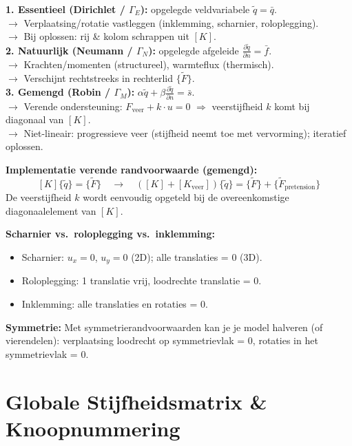 \documentclass[a4paper,10pt]{article}
\begin{document}
\begin{exambox}
\textbf{1. Essentieel (Dirichlet / $\Gamma_E$):} opgelegde veldvariabele $\tilde{q} = \bar{q}$.\\
  $\to$ Verplaatsing/rotatie vastleggen (inklemming, scharnier, roloplegging).\\
  $\to$ Bij oplossen: rij \& kolom schrappen uit $[K]$.\\[4pt]
\textbf{2. Natuurlijk (Neumann / $\Gamma_N$):} opgelegde afgeleide $\frac{\partial\tilde{q}}{\partial n} = \bar{f}$.\\
  $\to$ Krachten/momenten (structureel), warmteflux (thermisch).\\
  $\to$ Verschijnt rechtstreeks in rechterlid $\{\tilde{F}\}$.\\[4pt]
\textbf{3. Gemengd (Robin / $\Gamma_M$):} $\alpha\tilde{q} + \beta\frac{\partial\tilde{q}}{\partial n} = \bar{s}$.\\
  $\to$ Verende ondersteuning: $F_{\text{veer}} + k\cdot u = 0$ $\Rightarrow$ veerstijfheid $k$ komt bij diagonaal van $[K]$.\\
  $\to$ Niet-lineair: progressieve veer (stijfheid neemt toe met vervorming); iteratief oplossen.
\end{exambox}

\textbf{Implementatie verende randvoorwaarde (gemengd):}
\[
  [K]\{\tilde{q}\} = \{\tilde{F}\} \quad \to \quad ([K] + [K_{\text{veer}}])\{\tilde{q}\} = \{\tilde{F}\} + \{\tilde{F}_{\text{pretension}}\}
\]
De veerstijfheid $k$ wordt eenvoudig opgeteld bij de overeenkomstige diagonaalelement van $[K]$.

\textbf{Scharnier vs.\ roloplegging vs.\ inklemming:}
\begin{itemize}
  \item Scharnier: $u_x = 0$, $u_y = 0$ (2D); alle translaties = 0 (3D).
  \item Roloplegging: 1 translatie vrij, loodrechte translatie = 0.
  \item Inklemming: alle translaties en rotaties = 0.
\end{itemize}

\textbf{Symmetrie:} Met symmetrierandvoorwaarden kan je je model halveren (of vierendelen): verplaatsing loodrecht op symmetrievlak = 0, rotaties in het symmetrievlak = 0.

\section{Globale Stijfheidsmatrix \& Knoopnummering}
\end{document}
